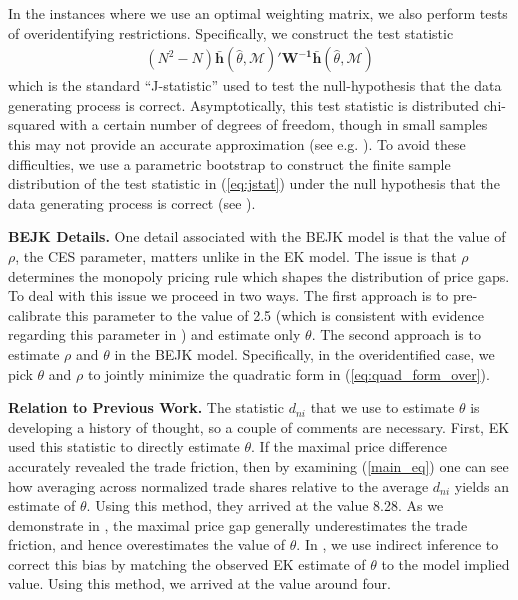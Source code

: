 \documentclass[12pt,dvips, ps2pdf]{article}
\begin{document}
In the instances where we use an optimal weighting matrix, we also perform tests of overidentifying restrictions. Specifically, we construct the test statistic
\begin{align}
(N^2-N)\mathbf{\bar{h}}(\hat \theta,\mathcal{M})'\mathbf{W^{-1}}\mathbf{\bar{h}}(\hat \theta,\mathcal{M})
\label{eq:jstat}
\end{align}
which is the standard ``J-statistic'' used to test the null-hypothesis that the data generating process is correct. Asymptotically, this test statistic is distributed chi-squared with a certain number of degrees of freedom, though in small samples this may not provide an accurate approximation (see e.g. \citet{hansen1996finite}). To avoid these difficulties, we use a parametric bootstrap to construct the finite sample distribution of the test statistic in (\ref{eq:jstat}) under the null hypothesis that the data generating process is correct (see \citet{davison1997bootstrap}).

\textbf{BEJK Details.} One detail associated with the BEJK model is that the value of $\rho$, the CES parameter, matters unlike in the EK model. The issue is that $\rho$ determines the monopoly pricing rule which shapes the distribution of price gaps. To deal with this issue we proceed in two ways. The first approach is to pre-calibrate this parameter to the value of 2.5 (which is consistent with evidence regarding this parameter in \citet{bwqje}) and estimate only $\theta$. The second approach is to estimate $\rho$ and $\theta$ in the BEJK model. Specifically, in the overidentified case, we pick $\theta$ and $\rho$ to jointly minimize the quadratic form in (\ref{eq:quad_form_over}).

\textbf{Relation to Previous Work.} The statistic $d_{ni}$ that we use to estimate $\theta$ is developing a history of thought, so a couple of comments are necessary. First, EK used this statistic to directly estimate $\theta$. If the maximal price difference accurately revealed the trade friction, then by examining (\ref{main_eq}) one can see how averaging across normalized trade shares relative to the average $d_{ni}$ yields an estimate of $\theta$. Using this method, they arrived at the value 8.28. As we demonstrate in \citet{sw_jie}, the maximal price gap generally underestimates the trade friction, and hence overestimates the value of $\theta$. In \citet{sw_jie}, we use indirect inference to correct this bias by matching the observed EK estimate of $\theta$ to the model implied value. Using this method, we arrived at the value around four.
\end{document}
